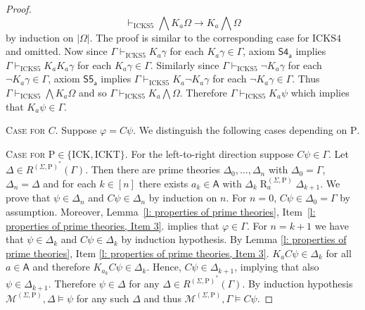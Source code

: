 \documentclass[10pt,a4paper]{amsart}
\newcommand\A{\mathsf{A}}
\newcommand\C {C}
\newcommand{\K}{K}
\newcommand{\Rel}{\mathrel{R}}
\newcommand{\agi}{a}
\newcommand{\fw}{\mathcal{M}}
\newcommand{\hick}{\mathrm{ICK}}
\newcommand{\hickp}{\mathrm{P}}
\newcommand{\hicks}{\mathrm{ICKS4}}
\newcommand{\hickss}{\mathrm{ICKS5}}
\newcommand{\hickt}{\mathrm{ICKT}}
\begin{document}
\begin{proof}
\begin{equation}
     \vdash_\hickss \bigwedge \K_\agi \Omega \rightarrow \K_\agi \bigwedge \Omega
 \end{equation}
 by induction on $\lvert \Omega \rvert$. The proof is similar to the corresponding case for $\hicks$ and omitted. Now since $\Gamma \vdash_\hickss \K_\agi \gamma$ for each $\K_\agi \gamma \in \Gamma$, axiom $\mathsf{S4_\agi}$ implies $\Gamma \vdash_\hickss \K_\agi \K_\agi \gamma$ for each $\K_\agi \gamma \in \Gamma$. Similarly since $\Gamma \vdash_\hickss \neg \K_\agi \gamma$ for each $\neg \K_\agi \gamma \in \Gamma$, axiom $\mathsf{S5_\agi}$ implies $\Gamma \vdash_\hickss \K_\agi \neg \K_\agi \gamma$ for each $\neg \K_\agi \gamma \in \Gamma$. Thus $\Gamma \vdash_\hickss \bigwedge \K_\agi \Omega$ and so $\Gamma \vdash_\hickss \K_\agi \bigwedge \Omega$. Therefore $\Gamma \vdash_\hickss \K_\agi \psi$ which implies that $\K_\agi \psi \in \Gamma$.
 \smallskip
     
   \setlength{\leftskip}{0cm}  \noindent \textsc{Case for $\C$.} Suppose $\varphi = \C \psi$. We distinguish the following cases depending on $\hickp$. \smallskip

   \setlength{\leftskip}{0.5cm} \noindent \textsc{Case for $\hickp \in \{\hick, \hickt\}$.} For the left-to-right direction suppose $\C \psi \in \Gamma$. Let $\Delta \in R^{(\Sigma, \hickp)^*}(\Gamma)$. Then there are prime theories $\Delta_0, \ldots, \Delta_n$ with $\Delta_0 = \Gamma$, $ \Delta_n = \Delta$ and for each $k \in [n]$ there exists $\agi_k \in \A$ with $\Delta_k \Rel_\agi^{(\Sigma, \hickp)} \Delta_{k+1}$. We prove that $\psi \in \Delta_n$ and $\C \psi \in \Delta_n$ by induction on $n$. For $n=0$, $\C \psi \in \Delta_0 = \Gamma$ by assumption. Moreover, Lemma~\ref{l: properties of prime theories}, Item~\ref{l: properties of prime theories, Item 3}. implies that $\varphi \in \Gamma$. For $n = k+1$ we have that $\psi \in \Delta_k$ and $\C \psi \in \Delta_k$ by induction hypothesis. By Lemma \ref{l: properties of prime theories}, Item \ref{l: properties of prime theories, Item 3}. $\K_\agi \C \psi \in \Delta_k$ for all $\agi \in \A$ and therefore $\K_{\agi_k} \C \psi \in \Delta_k$. Hence, $\C \psi \in \Delta_{k+1}$, implying that also $\psi \in \Delta_{k+1}$. Therefore $\psi \in \Delta$ for any $\Delta \in R^{(\Sigma, \hickp)^*}(\Gamma)$. By induction hypothesis $\fw^{(\Sigma, \hickp)}, \Delta \models \psi$ for any such $\Delta$ and thus $\fw^{(\Sigma, \hickp)}, \Gamma \models \C \psi$. 
     

\end{proof}
\end{document}
